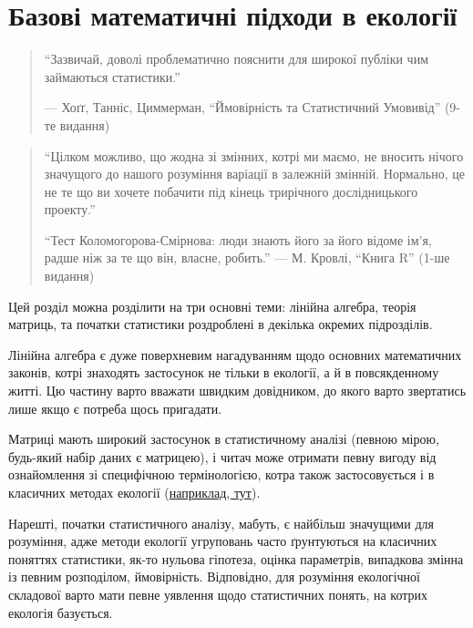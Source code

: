 \documentclass[
  11pt,
]{book}
\begin{document}
\chapter{Базові математичні підходи в екології}\label{numerical-ecology}

\begin{quote}
``Зазвичай, доволі проблематично пояснити для широкої публіки
чим займаються статистики.''

--- Хоґґ, Танніс, Циммерман, ``Ймовірність та Статистичний Умовивід'' (9-те видання)
\end{quote}

\begin{quote}
``Цілком можливо, що жодна зі змінних, котрі ми маємо,
не вносить нічого значущого до нашого розуміння
варіації в залежній змінній.
Нормально, це не те що ви хочете побачити
під кінець трирічного дослідницького проекту.''

``Тест Коломогорова-Смірнова: люди знають його за його відоме ім'я,
радше ніж за те що він, власне, робить.''
--- М. Кровлі, ``Книга R'' (1-ше видання)
\end{quote}

Цей розділ можна розділити на три основні теми: лінійна алгебра, теорія матриць, та початки статистики роздроблені в декілька окремих підрозділів.

Лінійна алгебра є дуже поверхневим нагадуванням щодо основних математичних законів, котрі знаходять застосунок не тільки в екології, а й в повсякденному житті. Цю частину варто вважати швидким довідником, до якого варто звертатись лише якщо є потреба щось пригадати.

Матриці мають широкий застосунок в статистичному аналізі (певною мірою, будь-який набір даних є матрицею), і читач може отримати певну вигоду від ознайомлення зі специфічною термінологією, котра також застосовується і в класичних методах екології (\hyperref[Leslie-matrix]{наприклад, тут}).

Нарешті, початки статистичного аналізу, мабуть, є найбільш значущими для розуміння, адже методи екології угруповань часто ґрунтуються на класичних поняттях статистики, як-то нульова гіпотеза, оцінка параметрів, випадкова змінна із певним розподілом, ймовірність. Відповідно, для розуміння екологічної складової варто мати певне уявлення щодо статистичних понять, на котрих екологія базується.
\end{document}
